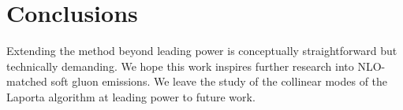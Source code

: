 \section{Conclusions}\label{sec:conclusions}

Extending the method beyond leading power is conceptually
straightforward but technically demanding. We hope this work inspires
further research into NLO-matched soft gluon emissions. We leave the
study of the collinear modes of the Laporta algorithm at leading power
to future work.

